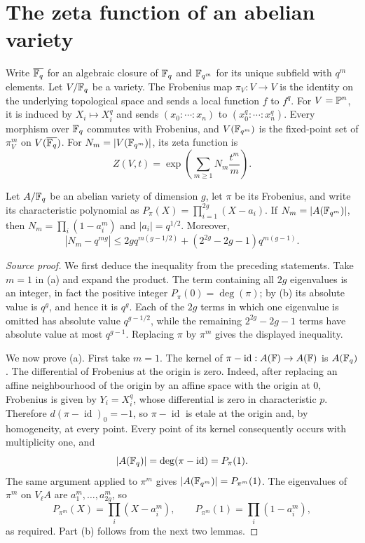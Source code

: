 \section{The zeta function of an abelian variety}
\begin{definition}\label{def:milne-frobenius-zeta}
Write $\overline{\mathbb{F}_q}$ for an algebraic closure of $\mathbb{F}_q$ and
$\mathbb{F}_{q^m}$ for its unique subfield with $q^m$ elements. Let $V/\mathbb{F}_q$ be a
variety. The Frobenius map $\pi_V:V\to V$ is the identity on the underlying
topological space and sends a local function $f$ to $f^q$. For
$V=\mathbb{P}^n$, it is induced by $X_i\mapsto X_i^q$ and sends
$(x_0:\cdots:x_n)$ to $(x_0^q:\cdots:x_n^q)$. Every morphism over $\mathbb{F}_q$
commutes with Frobenius, and $V(\mathbb{F}_{q^m})$ is the fixed-point set of
$\pi_V^m$ on $V(\overline{\mathbb{F}_q})$. For $N_m=|V(\mathbb{F}_{q^m})|$, its zeta function is
\[
 Z(V,t)=\exp\left(\sum_{m\geq 1}N_m\frac{t^m}{m}\right).
\]
\end{definition}

\begin{theorem}\label{thm:milne-zeta-weil-bounds}
Let $A/\mathbb{F}_q$ be an abelian variety of dimension $g$, let $\pi$ be its
Frobenius, and write its characteristic polynomial as
$P_\pi(X)=\prod_{i=1}^{2g}(X-a_i)$. If $N_m=|A(\mathbb{F}_{q^m})|$, then
$N_m=\prod_i(1-a_i^m)$ and $|a_i|=q^{1/2}$. Moreover,
\[
 |N_m-q^{mg}|\leq 2gq^{m(g-1/2)}+(2^{2g}-2g-1)q^{m(g-1)}.
\]
\end{theorem}

\begin{proof}[Source proof]

We first deduce the inequality from the preceding statements.  Take $m=1$
in (a) and expand the product.  The term containing all $2g$ eigenvalues is
an integer, in fact the positive integer $P_\pi(0)=\deg(\pi)$; by (b) its
absolute value is $q^g$, and hence it is $q^g$.  Each of the $2g$ terms in
which one eigenvalue is omitted has absolute value $q^{g-1/2}$, while the
remaining $2^{2g}-2g-1$ terms have absolute value at most $q^{g-1}$.
Replacing $\pi$ by $\pi^m$ gives the displayed inequality.

We now prove (a).  First take $m=1$.  The kernel of
$\pi-\operatorname{id}:A(\mathbb{F})\to A(\mathbb{F})$ is $A(\mathbb{F}_q)$.  The differential of Frobenius at
the origin is zero.  Indeed, after replacing an affine neighbourhood of the
origin by an affine space with the origin at $0$, Frobenius is given by
$Y_i=X_i^q$, whose differential is zero in characteristic $p$.  Therefore
$d(\pi-\operatorname{id})_0=-1$, so $\pi-\operatorname{id}$ is etale at the origin and, by homogeneity,
at every point.  Every point of its kernel consequently occurs with
multiplicity one, and
\[
 |A(\mathbb{F}_q)|=\deg(\pi-\operatorname{id})=P_\pi(1).
\]
The same argument applied to $\pi^m$ gives
$|A(\mathbb{F}_{q^m})|=P_{\pi^m}(1)$.  The eigenvalues of $\pi^m$ on $V_\ell A$
are $a_1^m,\ldots,a_{2g}^m$, so
\[
 P_{\pi^m}(X)=\prod_i(X-a_i^m),\qquad
 P_{\pi^m}(1)=\prod_i(1-a_i^m),
\]
as required.  Part (b) follows from the next two lemmas.

\end{proof}

